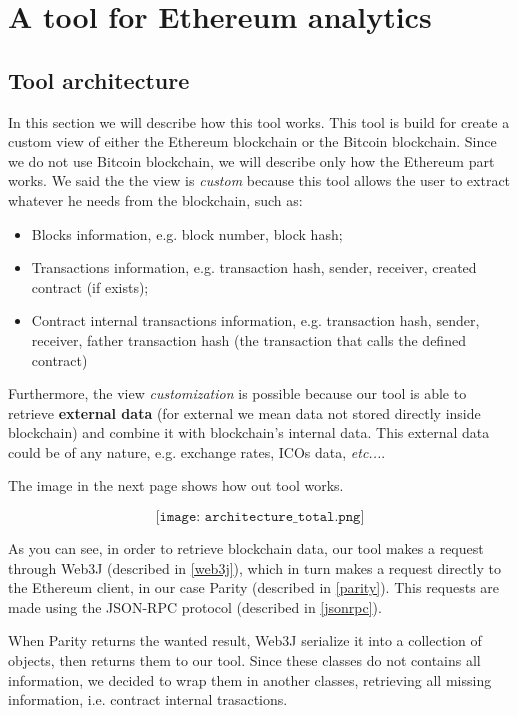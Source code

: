 \label{Chapter3}

\chapter{A tool for Ethereum analytics}
\section{Tool architecture}
In this section we will describe how this tool works. This tool is build for create a custom view of either the Ethereum blockchain or the Bitcoin blockchain.
\newline 
Since we do not use Bitcoin blockchain, we will describe only how the Ethereum part works. We said the the view is \textit{custom} because this tool allows the user to extract whatever he needs from the blockchain, such as:
\begin{itemize}
    \item Blocks information, e.g. block number, block hash;
    \item Transactions information, e.g. transaction hash, sender, receiver, created contract (if exists);
    \item Contract internal transactions information, e.g. transaction hash, sender, receiver, father transaction hash (the transaction that calls the defined contract)
\end{itemize}

Furthermore, the view \textit{customization} is possible because our tool is able to retrieve \textbf{external data} (for external we mean data not stored directly inside blockchain) and combine it with blockchain's internal data. This external data could be of any nature, e.g. exchange rates, ICOs data, \textit{etc...}.

The image in the next page shows how out tool works. %
\begin{center}
    \[
        \texttt{[image: architecture\_total.png]}
    \]
\end{center}
As you can see, in order to retrieve blockchain data, our tool makes a request through Web3J (described in \ref{web3j}), which in turn makes a request directly to the Ethereum client, in our case Parity (described in \ref{parity}). This requests are made using the JSON-RPC protocol (described in \ref{jsonrpc}). 

When Parity returns the wanted result, Web3J serialize it into a collection of objects, then returns them to our tool. Since these classes do not contains all information, we decided to wrap them in another classes, retrieving all missing information, i.e. contract internal trasactions.

